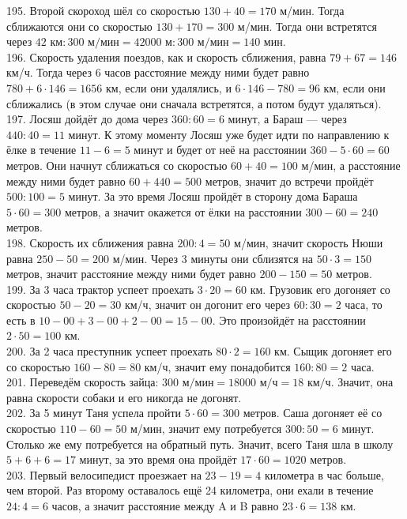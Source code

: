 \documentclass[12pt]{article}
\begin{document}
195. Второй скороход шёл со скоростью $130+40=170$ м/мин. Тогда сближаются они со скоростью $130+170=300$ м/мин. Тогда они встретятся через $42\text{ км}:300\text{ м/мин}=42000\text{ м}:300\text{ м/мин}=140\text{ мин.}$\\
196. Скорость удаления поездов, как и скорость сближения, равна $79+67=146$ км/ч. Тогда через 6 часов расстояние между ними будет равно $780+6\cdot146=1656$ км, если они удалялись, и $6\cdot146-780=96$ км, если они сближались (в этом случае они сначала встретятся, а потом будут удаляться).\\
197. Лосяш дойдёт до дома через $360:60=6$ минут, а Бараш --- через $440:40=11$ минут. К этому моменту Лосяш уже будет идти по направлению к ёлке в течение $11-6=5$ минут и будет от неё на расстоянии $360-5\cdot60=60$ метров. Они начнут сближаться со скоростью $60+40=100$ м/мин, а расстояние между ними будет равно $60+440=500$ метров, значит до встречи пройдёт $500:100=5$ минут. За это время Лосяш пройдёт в сторону дома Бараша $5\cdot60=300$ метров, а значит окажется от ёлки на расстоянии $300-60=240$ метров.\\
198. Скорость их сближения равна $200:4=50$ м/мин, значит скорость Нюши равна $250-50=200$ м/мин. Через 3 минуты они сблизятся на $50\cdot3=150$ метров, значит расстояние между ними будет равно $200-150=50$ метров.\\
199. За 3 часа трактор успеет проехать $3\cdot20=60$ км. Грузовик его догоняет со скоростью $50-20=30$ км/ч, значит он догонит его через $60:30=2$ часа, то есть в $10-00+3-00+2-00=15-00.$ Это произойдёт на расстоянии $2\cdot50=100$ км.\\
200. За 2 часа преступник успеет проехать $80\cdot2=160$ км. Сыщик догоняет его со скоростью $160-80=80$ км/ч, значит ему понадобится $160:80=2$ часа.\\
201. Переведём скорость зайца: $300\text{ м/мин}=18000\text{ м/ч}=18\text{ км/ч.}$ Значит, она равна скорости собаки и его никогда не догонят.\\
202. За 5 минут Таня успела пройти $5\cdot60=300$ метров. Саша догоняет её со скоростью $110-60=50$ м/мин, значит ему потребуется $300:50=6$ минут. Столько же ему потребуется на обратный путь. Значит, всего Таня шла в школу $5+6+6=17$ минут, за это время она пройдёт $17\cdot60=1020$ метров.\\
203. Первый велосипедист проезжает на $23-19=4$ километра в час больше, чем второй. Раз второму оставалось ещё 24 километра, они ехали в течение $24:4=6$ часов, а значит расстояние между A и B равно $23\cdot6=138$ км.\\
\end{document}
